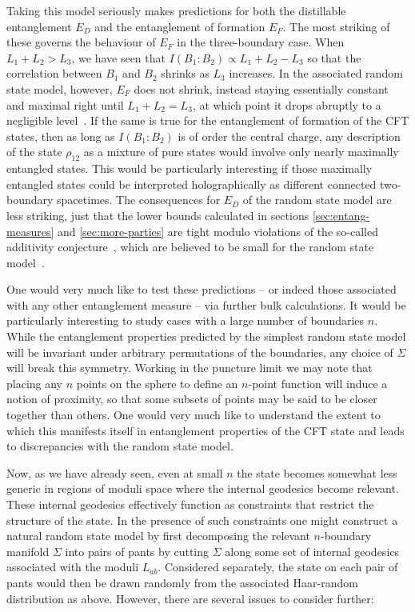 \documentclass[12pt]{article}
\numberwithin{equation}{section}
\begin{document}
Taking this model seriously makes predictions for both the distillable entanglement $E_D$ and the entanglement of formation $E_F$. The most striking of these governs the behaviour of $E_F$ in the three-boundary case. When $L_1 + L_2 > L_3$, we have seen that $I(B_1:B_2) \propto L_1 + L_2 - L_3$ so that the correlation between $B_1$ and $B_2$ shrinks as $L_3$ increases. In the associated random state model, however, $E_F$ does not shrink, instead staying essentially constant and maximal right until $L_1 + L_2 = L_3$, at which point it drops abruptly to a negligible level~\cite{hayden2006aspects}. If the same is true for the entanglement of formation of the CFT states, then as long as $I(B_1:B_2)$ is of order the central charge, any description of the state $\rho_{12}$ as a mixture of pure states would involve only nearly maximally entangled states. This would be particularly interesting if those maximally entangled states could be interpreted holographically as different connected two-boundary spacetimes. The consequences for $E_D$ of the random state model are less striking, just that the lower bounds calculated in sections \ref{sec:entang-measures} and \ref{sec:more-parties} are tight modulo violations of the so-called additivity conjecture~\cite{hayden2006aspects}, which are believed to be small for the random state model~\cite{belinschi2013almost}.

One would very much like to test these predictions -- or indeed those associated with any other entanglement measure -- via further bulk calculations. It would be particularly interesting to study cases with a large number of boundaries $n$.  While the entanglement properties predicted by the simplest random state model will be invariant under arbitrary permutations of the boundaries, any choice of $\Sigma$ will break this symmetry.  Working in the puncture limit we may note that placing any $n$ points on the sphere to define an $n$-point function will induce a notion of proximity, so that some subsets of points may be said to be closer together than others.  One would very much like to understand the extent to which this manifests itself in entanglement properties of the CFT state and leads to discrepancies with the random state model.

Now, as we have already seen, even at small $n$ the state becomes somewhat less generic in regions of moduli space where the internal geodesics become relevant.  These internal geodesics effectively function as constraints that restrict the structure of the state.  In the presence of such constraints one might construct a natural random state model by first decomposing the relevant $n$-boundary manifold $\Sigma$ into pairs of pants by cutting $\Sigma$ along some set of internal geodesics associated with the moduli $L_{ab}$.  Considered separately, the state on each pair of pants would then be drawn randomly from the associated Haar-random distribution as above.  However, there are several issues to consider further:
\end{document}
